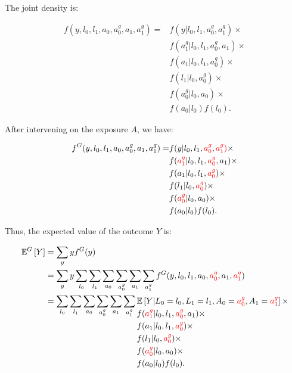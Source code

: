 \documentclass[12pt,twoside]{article}
\begin{document}
The joint density is:

\begin{align}
    f(y,l_0,l_1,a_0,a_0^g,a_1,a_1^g) = &f(y|l_0,l_1,a_0^g,a_1^g)\times\\
    &f(a_1^g|l_0,l_1,a_0^g,a_1)\times\\
    &f(a_1|l_0,l_1,a_0^g)\times\\
    &f(l_1|l_0,a_0^g)\times\\
    &f(a_0^g|l_0,a_0)\times\\
    &f(a_0|l_0) f(l_0).
\end{align}

After intervening on the exposure $A$, we have:

\begin{align}
    f^G(y,l_0,l_1,a_0,a_0^g,a_1,a_1^g) = &f(y|l_0,l_1,\textcolor{red}{a_0^g},\textcolor{red}{a_1^g)}\times\\
    &f(\textcolor{red}{a_1^g}|l_0,l_1,\textcolor{red}{a_0^g},a_1)\times\\
    &f(a_1|l_0,l_1,\textcolor{red}{a_0^g})\times\\
    &f(l_1|l_0,\textcolor{red}{a_0^g})\times\\
    &f(\textcolor{red}{a_0^g}|l_0,a_0)\times\\
    &f(a_0|l_0) f(l_0).
\end{align}

Thus, the expected value of the outcome $Y$ is:

\begin{align}
    \mathbb{E}^G \left[ Y \right] &= \sum_y y f^G(y) \\
    &= \sum_y y \sum_{l_0} \sum_{l_1} \sum_{a_0} \sum_{a_0^g} \sum_{a_1} \sum_{a_1^g} f^G(y,l_0,l_1,a_0,\textcolor{red}{a_0^g},a_1,\textcolor{red}{a_1^g}) \\
    &= \sum_{l_0} \sum_{l_1} \sum_{a_0} \sum_{a_0^g} \sum_{a_1} \sum_{a_1^g}
    \!\begin{aligned}[t]
        &\mathbb{E} \left[ Y|L_0=l_0,L_1=l_1,A_0=\textcolor{red}{a_0^g},A_1=\textcolor{red}{a_1^g} \right]\times\\
        &f(\textcolor{red}{a_1^g}|l_0,l_1,\textcolor{red}{a_0^g},a_1)\times\\
        &f(a_1|l_0,l_1,\textcolor{red}{a_0^g})\times\\
        &f(l_1|l_0,\textcolor{red}{a_0^g})\times\\
        &f(\textcolor{red}{a_0^g}|l_0,a_0)\times\\
        &f(a_0|l_0) f(l_0).
    \end{aligned}
\end{align}
\end{document}
